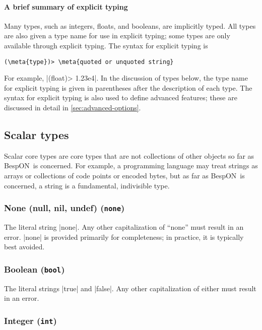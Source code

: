 \documentclass[11pt]{article}
\newcommand{\bespon}{BespON}
\newcommand{\meta}[1]{\ensuremath{\langle}\textit{#1}\ensuremath{\rangle}}
\begin{document}
\paragraph{A brief summary of explicit typing}

Many types, such as integers, floats, and booleans, are implicitly typed.  All types are also given a type name for use in explicit typing; some types are only available through explicit typing.  The syntax for explicit typing is
\begin{Verbatim}[commandchars=\\\{\}]
(\meta{type})> \meta{quoted or unquoted string}
\end{Verbatim}
For example, |(float)> 1.23e4|.  In the discussion of types below, the type name for explicit typing is given in parentheses after the description of each type.  The syntax for explicit typing is also used to define advanced features; these are discussed in detail in \cref{sec:advanced-options}.


\subsection{Scalar types}

Scalar core types are core types that are not collections of other objects so far as \bespon\ is concerned.  For example, a programming language may treat strings as arrays or collections of code points or encoded bytes, but as far as \bespon\ is concerned, a string is a fundamental, indivisible type.


\subsubsection{None (null, nil, undef) (\texttt{none})}

The literal string |none|.  Any other capitalization of ``none'' must result in an error.  |none| is provided primarily for completeness; in practice, it is typically best avoided.


\subsubsection{Boolean (\texttt{bool})}

The literal strings |true| and |false|.  Any other capitalization of either must result in an error.


\subsubsection{Integer (\texttt{int})}
\end{document}

